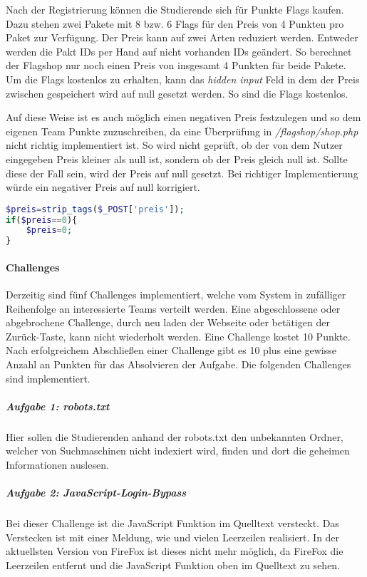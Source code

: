 Nach der Registrierung können die Studierende sich für Punkte Flags kaufen. Dazu stehen zwei Pakete mit 8 bzw. 6 Flags für den Preis von 4 Punkten pro Paket zur Verfügung. Der Preis kann auf zwei Arten reduziert werden. Entweder werden die Pakt IDs per Hand auf nicht vorhanden IDs geändert. So berechnet der Flagshop nur noch einen Preis von insgesamt 4 Punkten für beide Pakete. Um die Flags kostenlos zu erhalten, kann das \textit{hidden input} Feld in dem der Preis zwischen gespeichert wird auf null gesetzt werden. So sind die Flags kostenlos. \cite[S. 63]{abtsUeberarbeitungUndErweiterung2016}

Auf diese Weise ist es auch möglich einen negativen Preis festzulegen und so dem eigenen Team Punkte zuzuschreiben, da eine Überprüfung in \textit{/flagshop/shop.php} nicht richtig implementiert ist. So wird nicht geprüft, ob der von dem Nutzer eingegeben Preis kleiner als null ist, sondern ob der Preis gleich null ist. Sollte diese der Fall sein, wird der Preis auf null gesetzt. Bei richtiger Implementierung würde ein negativer Preis auf null korrigiert.

\begin{lstlisting}[language=PHP,caption={Aktuelle Prüfung des Preises},captionpos=b]
$preis=strip_tags($_POST['preis']);
if($preis==0){
	$preis=0;
}
\end{lstlisting}

\paragraph{Challenges} \label{para:Challenges}
Derzeitig sind fünf Challenges implementiert, welche vom System in zufälliger Reihenfolge an interessierte Teams verteilt werden. Eine abgeschlossene oder abgebrochene Challenge, durch neu laden der Webseite oder betätigen der Zurück-Taste, kann nicht wiederholt werden. Eine Challenge kostet 10 Punkte. Nach erfolgreichem Abschließen einer Challenge gibt es 10 plus eine gewisse Anzahl an Punkten für das Absolvieren der Aufgabe. Die folgenden Challenges sind implementiert\cite[S.19-20]{abtsUeberarbeitungUndErweiterung2016}.

\subparagraph{Aufgabe 1: robots.txt}\label{subpara:Aufgabe_1_robots.txt}
Hier sollen die Studierenden anhand der robots.txt den unbekannten Ordner, welcher von Suchmaschinen nicht indexiert wird, finden und dort die geheimen Informationen auslesen.

\subparagraph{Aufgabe 2: JavaScript-Login-Bypass}\label{subpara:Aufgabe_2_JavaScript-Login-Bypass}
Bei dieser Challenge ist die JavaScript Funktion im Quelltext versteckt. Das Verstecken ist mit einer Meldung, wie  und vielen Leerzeilen realisiert. In der aktuellsten Version von FireFox ist dieses nicht mehr möglich, da FireFox die Leerzeilen entfernt und die JavaScript Funktion oben im Quelltext zu sehen.

